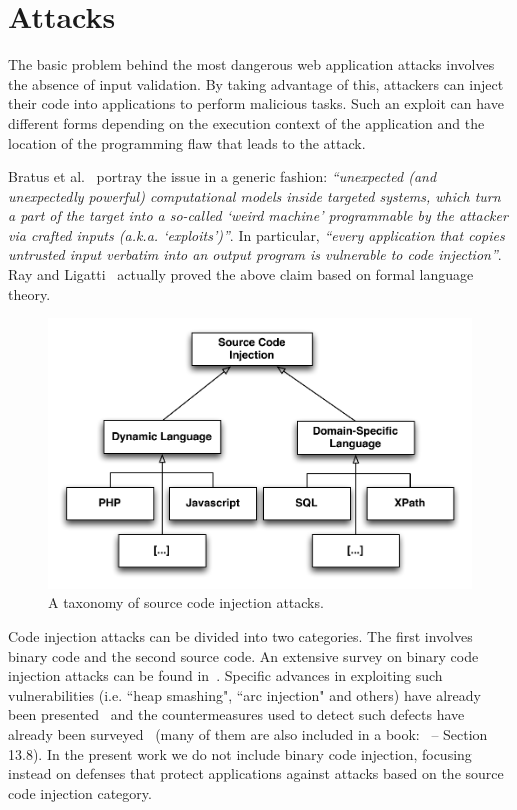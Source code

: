 \documentclass[conference]{IEEEtran}
\begin{document}
\section{Attacks}
\label{sec:attacks}

The basic problem behind the most dangerous
web application attacks involves
the absence of input validation. By taking advantage of
this, attackers can inject their code into
applications to perform malicious tasks. Such
an exploit can have different forms depending on the
execution context of the application and the location
of the programming flaw that leads to the attack.

Bratus et al.~\cite{BLSPS11} portray the issue in a generic fashion:
{\it ``unexpected (and unexpectedly powerful) computational models
  inside targeted systems, which turn a part of the target into a
  so-called `weird machine' programmable by the attacker via crafted
  inputs (a.k.a. `exploits')''}. In particular, {\it ``every
  application that copies untrusted input verbatim into an output
  program is vulnerable to code injection''}. Ray and
Ligatti~\cite{RL12b} actually proved the above claim based on formal
language theory.

\begin{figure}
\begin{center}
\leavevmode
\includegraphics[scale=0.47]{attack-tree-uml.pdf}
\end{center}
\caption{\label{fig:taxonomy}A taxonomy of source
code injection attacks.}
\end{figure}

Code injection attacks can be divided into two categories. The first
involves binary code and the second source code. An
extensive survey on binary code injection attacks can be found
in~\cite{LC03}. Specific advances in exploiting such vulnerabilities
(i.e. ``heap smashing", ``arc injection" and others) have already
been presented~\cite{PB04} and the countermeasures used to detect such
defects have already been surveyed~\cite{YJP12} (many of them are also
included in a book:~\cite{DKZ12} -- Section 13.8). In the present work
we do not include binary code injection, focusing instead on defenses
that protect applications against attacks based on the
source code injection category.
\end{document}
